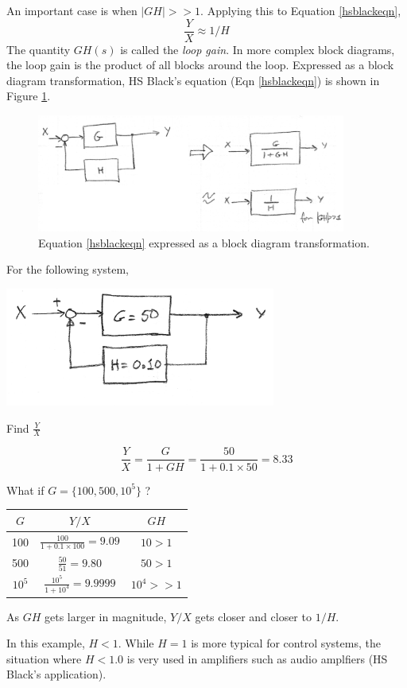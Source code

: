 An important case is when $|GH| >> 1$.   Applying this to Equation \ref{hsblackeqn},
\[
\frac{Y}{X} \approx 1/H
\]
The quantity $GH(s)$ is called the {\it loop gain}.   In more complex block diagrams, the loop gain is the product of all blocks around the loop.
Expressed as a block diagram transformation, HS Black's equation (Eqn \ref{hsblackeqn}) is shown in Figure \ref{hsblacktransforms}.


\begin{figure}\centering
\includegraphics[width=4.0in]{figs06/00770a.png}
\caption{Equation \ref{hsblackeqn} expressed as a block diagram transformation.}\label{hsblacktransforms}
\end{figure}




\begin{ExampleSmall}
For the following system,

\includegraphics[width=3.5in]{figs06/00771a.png}

Find $\frac {Y}{X}$

\[
\frac{Y}{X} = \frac {G} {1+GH} =  \frac {50 }   {1+0.1\times 50} = 8.33
\]


\vspace{0.2in}
What if $G = \{100, 500, 10^5\}$ ?

\vspace{0.1in}
\begin{tabular}{|c|c|c|} \hline
$G$         & $Y/X$      &  $GH$   \\ \hline
 100        & $\frac{100}{1+0.1\times100 } = 9.09$      &  $10>1$        \\ \hline
 500        & $\frac{50}{51} = 9.80$                    &  $50 > 1$      \\ \hline
 $10^5$     & $\frac{10^5}{1+10^4} = 9.9999$            &  $10^4 >> 1$   \\ \hline
\end{tabular}

\vspace{0.05in}
As $GH$ gets larger in magnitude, $Y/X$ gets closer and closer to $1/H$.

In this example, $H<1$.  While $H=1$ is more typical for control systems, the situation where $H<1.0$ is very used in amplifiers such as audio amplfiers (HS Black's application).

\end{ExampleSmall}


